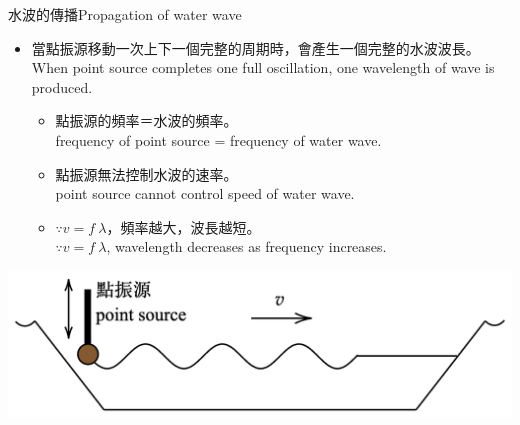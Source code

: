 \documentclass[beamer=true]{standalone}
\begin{document}
\begin{frame}{水波的傳播Propagation of water wave}
    \begin{itemize}
        \item 當點振源移動一次上下一個完整的周期時，會產生一個完整的水波波長。\\When point source completes one full oscillation, one wavelength of wave is produced.
              \begin{itemize}
                  \item 點振源的頻率＝水波的頻率。\\frequency of point source = frequency of water wave.
                  \item 點振源無法控制水波的速率。\\ point source cannot control speed of water wave.
                  \item $\because v=f\ \lambda$，頻率越大，波長越短。\\$\because v=f\ \lambda$, wavelength decreases as frequency increases.
              \end{itemize}
    \end{itemize}
    \par{\par\centering\includegraphics[width=.6\textwidth]{./img/ch2_cf_2024-05-24-13-19-18.png}\par}
\end{frame}
\end{document}

